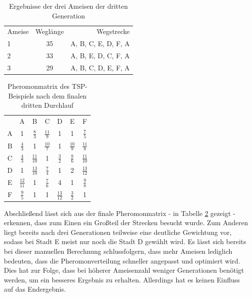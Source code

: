 	\begin{table}
		\centering
		\footnotesize
		\begin{tabular}{l c r}
			Ameise & Weglänge & Wegstrecke \\
			1 & 35 & A, B, C, E, D, F, A\\
			2 & 33 & A, B, E, D, C, F, A\\ 
			3 & 29 & A, B, C, D, E, F, A\\
		\end{tabular}
		\caption{Ergebnisse der drei Ameisen der dritten Generation}
		\label{tspAcoNumerisch_ergebnis_3}
	\end{table}

	\begin{table}
		\centering
		\footnotesize
		\begin{tabular}{c c c c c c c}
			& A & B & C & D & E & F \\
			A & 1 & $\frac{8}{3}$ & $\frac{11}{9}$ & 1 & 1 & $\frac{7}{5}$\\ 
			B & $\frac{4}{3}$ & 1 & $\frac{10}{7}$ & 1 & $\frac{10}{9}$ & $\frac{11}{8}$\\ 
			C & $\frac{4}{3}$ & $\frac{11}{10}$ & 1 & $\frac{3}{2}$ & $\frac{8}{6}$ & $\frac{11}{10}$\\
			D & 1 & $\frac{13}{10}$ & $\frac{7}{4}$ & 1 & 2 & $\frac{13}{12}$\\
			E & $\frac{12}{11}$ & 1 & $\frac{7}{6}$ & 4 & 1 & $\frac{9}{8}$\\
			F & $\frac{9}{5}$ & 1 & 1 & $\frac{13}{12}$ & $\frac{3}{2}$ & 1\\
		\end{tabular}
		\caption{Pheromonmatrix des \ac{TSP}-Beispiels nach dem finalen dritten Durchlauf}
		\label{tspAcoNumerisch_pheromon_3}
	\end{table}

	Abschließend lässt sich aus der finale Pheromonmatrix - in Tabelle \ref{tspAcoNumerisch_pheromon_3} gezeigt - erkennen, dass zum Einen ein Großteil der Strecken besucht wurde. Zum Anderen liegt bereits nach drei Generationen teilweise eine deutliche Gewichtung vor, sodass bei Stadt E meist nur noch die Stadt D gewählt wird.
	Es lässt sich bereits bei dieser manuellen Berechnung schlussfolgern, dass mehr Ameisen lediglich bedeuten, dass die Pheromonverteilung schneller angepasst und optimiert wird. Dies hat zur Folge, dass bei höherer Ameisenzahl weniger Generationen benötigt werden, um ein besseres Ergebnis zu erhalten. Allerdings hat es keinen Einfluss auf das Endergebnis.